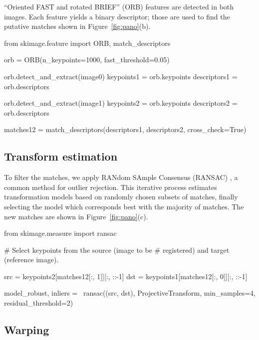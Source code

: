     ``Oriented FAST and rotated BRIEF'' (ORB) features \citep{ORB} are detected in both images. Each feature yields a binary descriptor; those are used to find the putative matches shown in Figure~\ref{fig:pano}(b).

    \begin{pyverbatim}
      from skimage.feature import ORB, match_descriptors

      orb = ORB(n_keypoints=1000, fast_threshold=0.05)

      orb.detect_and_extract(image0)
      keypoints1 = orb.keypoints
      descriptors1 = orb.descriptors

      orb.detect_and_extract(image1)
      keypoints2 = orb.keypoints
      descriptors2 = orb.descriptors

      matches12 = match_descriptors(descriptors1,
                                    descriptors2,
                                    cross_check=True)
    \end{pyverbatim}

  \subsection{Transform estimation}
    \label{sub:transform_estimation}

    To filter the matches, we apply RANdom SAmple Consensus (RANSAC) \citep{ransac}, a common method for outlier rejection. This iterative process estimates transformation models based on randomly chosen subsets of matches, finally selecting the model which corresponds best with the majority of matches. The new matches are shown in Figure~\ref{fig:pano}(c).

    \begin{pyverbatim}
      from skimage.measure import ransac

      # Select keypoints from the source (image to be
      # registered) and target (reference image).

      src = keypoints2[matches12[:, 1]][:, ::-1]
      dst = keypoints1[matches12[:, 0]][:, ::-1]

      model_robust, inliers = \
          ransac((src, dst), ProjectiveTransform,
                 min_samples=4, residual_threshold=2)
    \end{pyverbatim}

  \subsection{Warping}
    \label{sub:warping}

